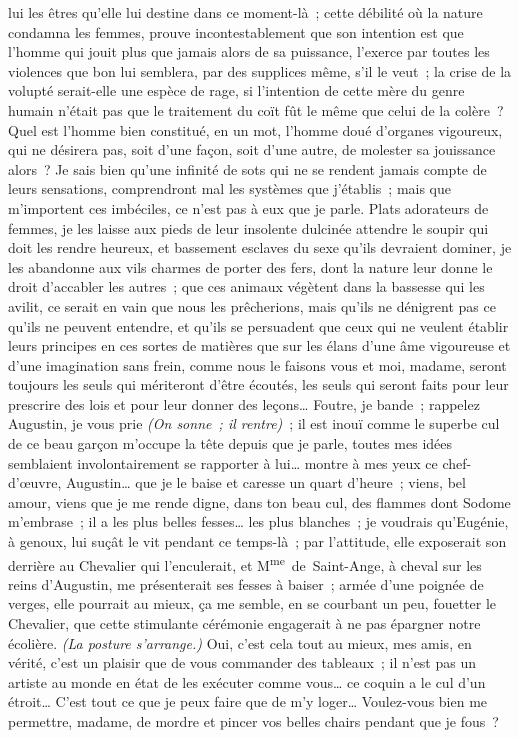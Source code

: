 \documentclass[french,twoside]{book} %
\begin{document}
lui les êtres qu’elle lui destine dans ce moment-là ; cette débilité où la nature condamna les femmes, prouve incontestablement que son intention est que l’homme qui jouit plus que jamais alors de sa puissance, l’exerce par toutes les violences que bon lui semblera, par des supplices même, s’il le veut ; la crise de la volupté serait-elle une espèce de rage, si l’intention de cette mère du genre humain n’était pas que le traitement du coït fût le même que celui de la colère ? Quel est l’homme bien constitué, en un mot, l’homme doué d’organes vigoureux, qui ne désirera pas, soit d’une façon, soit d’une autre, de molester sa jouissance alors ? Je sais bien qu’une infinité de sots qui ne se rendent jamais compte de leurs sensations, comprendront mal les systèmes que j’établis ; mais que m’importent ces imbéciles, ce n’est pas à eux que je parle. Plats adorateurs de femmes, je les laisse aux pieds de leur insolente dulcinée attendre le soupir qui doit les rendre heureux, et bassement esclaves du sexe qu’ils devraient dominer, je les abandonne aux vils charmes de porter des fers, dont la nature leur donne le droit d’accabler les autres ; que ces animaux végètent dans la bassesse qui les avilit, ce serait en vain que nous les prêcherions, mais qu’ils ne dénigrent pas ce qu’ils ne peuvent entendre, et qu’ils se persuadent que ceux qui ne veulent établir leurs principes en ces sortes de matières que sur les élans d’une âme vigoureuse et d’une imagination sans frein, comme nous le faisons vous et moi, madame, seront toujours les seuls qui mériteront d’être écoutés, les seuls qui seront faits pour leur prescrire des lois et pour leur donner des leçons… Foutre, je bande ; rappelez Augustin, je vous prie {\itshape (On sonne ; il rentre)} ; il est inouï comme le superbe cul de ce beau garçon m’occupe la tête depuis que je parle, toutes mes idées semblaient involontairement se rapporter à lui… montre à mes yeux ce chef-d’œuvre, Augustin… que je le baise et caresse un quart d’heure ; viens, bel amour, viens que je me rende digne, dans ton beau cul, des flammes dont Sodome m’embrase ; il a les plus belles fesses… les plus blanches ; je voudrais qu’Eugénie, à genoux, lui suçât le vit pendant ce temps-là ; par l’attitude, elle exposerait son derrière au Chevalier qui l’enculerait, et M\textsuperscript{me} de Saint-Ange, à cheval sur les reins d’Augustin, me présenterait ses fesses à baiser ; armée d’une poignée de verges, elle pourrait au mieux, ça me semble, en se courbant un peu, fouetter le Chevalier, que cette stimulante cérémonie engagerait à ne pas épargner notre écolière. {\itshape (La posture s’arrange.)} Oui, c’est cela tout au mieux, mes amis, en vérité, c’est un plaisir que de vous commander des tableaux ; il n’est pas un artiste au monde en état de les exécuter comme vous… ce coquin a le cul d’un étroit… C’est tout ce que je peux faire que de m’y loger… Voulez-vous bien me permettre, madame, de mordre et pincer vos belles chairs pendant que je fous ?\par
\end{document}
